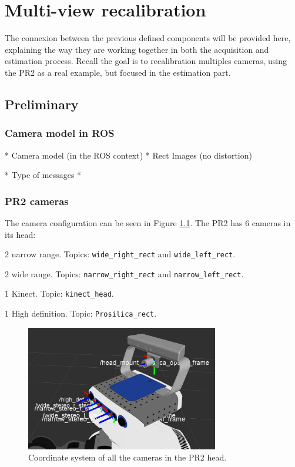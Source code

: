 \chapter{Multi-view recalibration}
\label{cha:multi-view calibration}

The connexion between the previous defined components will be provided here, explaining the way they are working together in both the acquisition and estimation process. Recall the goal is to recalibration multiples cameras, using the PR2 as a real example, but focused in the estimation part.

\section{Preliminary}

\subsection{Camera model in ROS}

* Camera model (in the ROS context)
* Rect Images (no distortion)

* Type of messages
*

\subsection{PR2 cameras}

The camera configuration can be seen in Figure \ref{fig:pr2_cameras}.
The PR2 has 6 cameras in its head:
\begin{itemize*}
 \item 2 narrow range. Topics: \texttt{wide\_right\_rect} and \texttt{wide\_left\_rect}.
 \item 2 wide range. Topics: \texttt{narrow\_right\_rect} and \texttt{narrow\_left\_rect}.
 \item 1 Kinect. Topic: \texttt{kinect\_head}.
 \item 1 High definition. Topic: \texttt{Prosilica\_rect}.
\end{itemize*}

\begin{figure}[!htbp]
 \centering
 \includegraphics[width=0.75\textwidth]{images/screenshots/PR2_cameras.png}
 \caption{Coordinate system of all the cameras in the PR2 head.}
 \label{fig:pr2_cameras}
\end{figure}






